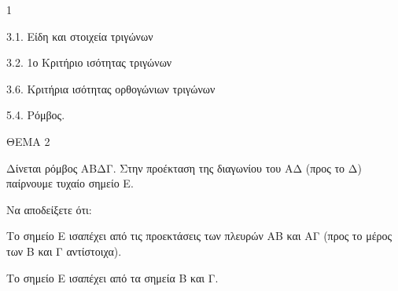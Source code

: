 \begin{ylh}{1}
    \item 3.1. Είδη και στοιχεία τριγώνων
    \item 3.2. 1ο Κριτήριο ισότητας τριγώνων
    \item 3.6. Κριτήρια ισότητας ορθογώνιων τριγώνων
    \item 5.4. Ρόμβος.
\end{ylh}

ΘΕΜΑ 2

Δίνεται ρόμβος ΑΒΔΓ. Στην προέκταση της διαγωνίου του ΑΔ (προς το Δ) παίρνουμε τυχαίο σημείο Ε.

Να αποδείξετε ότι:

\begin{alist}
\item Το σημείο Ε ισαπέχει από τις προεκτάσεις των πλευρών ΑΒ και ΑΓ (προς το μέρος των Β και Γ αντίστοιχα). 

\item Το σημείο Ε ισαπέχει από τα σημεία Β και Γ. 


\begin{center}
\end{center}
\end{alist}
